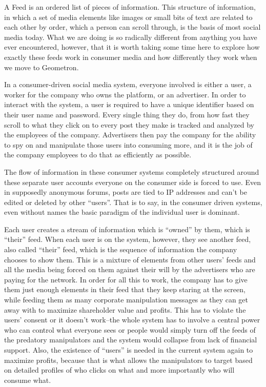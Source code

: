 
A Feed is an ordered list of pieces of information.  This structure of information, in which a set of media elements like images or small bits of text are related to each other by order, which a person can scroll through, is the basis of most social media today.  What we are doing is so radically different from anything you have ever encountered, however, that it is worth taking some time here to explore how exactly these feeds work in consumer media and how differently they work when we move to Geometron.

In a consumer-driven social media system, everyone involved is either a user, a worker for the company who owns the platform, or an advertiser.  In order to interact with the system, a user is required to have a unique identifier based on their user name and password.  Every single thing they do, from how fast they scroll to what they click on to every post they make is tracked and analyzed by the employees of the company. Advertisers then pay the company for the ability to spy on and manipulate those users into consuming more, and it is the job of the company employees to do that as efficiently as possible.  

The flow of information in these consumer systems completely structured around these separate user accounts everyone on the consumer side is forced to use.  Even in supposedly anonymous forums, posts are tied to IP addresses and can't be edited or deleted by other ``users''.  That is to say, in the consumer driven systems, even without names the basic paradigm of the individual user is dominant.  

Each user creates a stream of information which is ``owned'' by them, which is ``their'' feed.  When each user is on the system, however, they see another feed, also called ``their'' feed, which is the sequence of information the company chooses to show them.   This is a mixture of elements from other users' feeds and all the media being forced on them against their will by the advertisers who are paying for the network.  In order for all this to work, the company has to give them just enough elements in their feed that they keep staring at the screen, while feeding them as many corporate manipulation messages as they can get away with to maximize shareholder value and profits.  This has to violate the users' consent or it doesn't work--the whole system has to involve a central power who can control what everyone sees or people would simply turn off the feeds of the predatory manipulators and the system would collapse from lack of financial support.  Also, the existence of ``users'' is needed in the current system again to maximize profits, because that is what allows the manipulators to target based on detailed profiles of who clicks on what and more importantly who will consume what.

